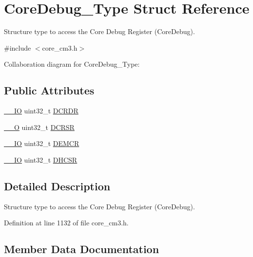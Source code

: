 \hypertarget{structCoreDebug__Type}{}\section{Core\+Debug\+\_\+\+Type Struct Reference}
\label{structCoreDebug__Type}


Structure type to access the Core Debug Register (Core\+Debug).  




{\ttfamily \#include $<$core\+\_\+cm3.\+h$>$}



Collaboration diagram for Core\+Debug\+\_\+\+Type\+:
\subsection*{Public Attributes}
\begin{DoxyCompactItemize}
\item 
\hyperlink{core__cm3_8h_aec43007d9998a0a0e01faede4133d6be}{\+\_\+\+\_\+\+IO} uint32\+\_\+t \hyperlink{structCoreDebug__Type_ab8f4bb076402b61f7be6308075a789c9}{D\+C\+R\+DR}
\item 
\hyperlink{core__cm3_8h_a7e25d9380f9ef903923964322e71f2f6}{\+\_\+\+\_\+O} uint32\+\_\+t \hyperlink{structCoreDebug__Type_afefa84bce7497652353a1b76d405d983}{D\+C\+R\+SR}
\item 
\hyperlink{core__cm3_8h_aec43007d9998a0a0e01faede4133d6be}{\+\_\+\+\_\+\+IO} uint32\+\_\+t \hyperlink{structCoreDebug__Type_a5cdd51dbe3ebb7041880714430edd52d}{D\+E\+M\+CR}
\item 
\hyperlink{core__cm3_8h_aec43007d9998a0a0e01faede4133d6be}{\+\_\+\+\_\+\+IO} uint32\+\_\+t \hyperlink{structCoreDebug__Type_a25c14c022c73a725a1736e903431095d}{D\+H\+C\+SR}
\end{DoxyCompactItemize}


\subsection{Detailed Description}
Structure type to access the Core Debug Register (Core\+Debug). 

Definition at line 1132 of file core\+\_\+cm3.\+h.



\subsection{Member Data Documentation}
